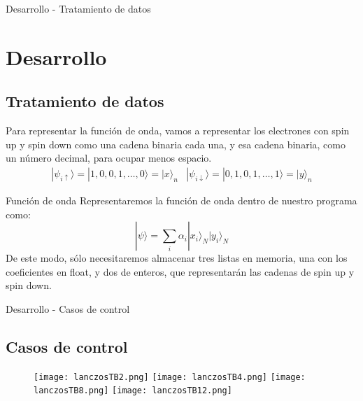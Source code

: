 \documentclass{beamer}
\begin{document}
\begin{frame}{Desarrollo - Tratamiento de datos}
    \section{Desarrollo}
    \subsection{Tratamiento de datos}
    Para representar la función de onda, vamos a representar los electrones con spin up y spin down como una cadena binaria cada una, y esa cadena binaria, como un número decimal, para ocupar menos espacio.
    $$
    \begin{array}{cc}
        |\psi_{i\uparrow}\rangle = |1, 0, 0, 1, \ldots, 0\rangle = |x\rangle_n & |\psi_{i\downarrow}\rangle = |0, 1, 0, 1, \ldots, 1\rangle = |y\rangle_n
    \end{array}
    $$
    \begin{block}{Función de onda}
        Representaremos la función de onda dentro de nuestro programa como:
        $$
        |\psi\rangle = \sum_i\alpha_i|x_i\rangle_N|y_i\rangle_N
        $$
        De este modo, sólo necesitaremos almacenar tres listas en memoria, una con los coeficientes en float, y dos de enteros, que representarán las cadenas de spin up y spin down.
    \end{block}
\end{frame}
\begin{frame}{Desarrollo - Casos de control}
    \subsection{Casos de control}
    \begin{figure}[h!]
        \begin{center}
            \texttt{[image: lanczosTB2.png]}
            \texttt{[image: lanczosTB4.png]}
            \texttt{[image: lanczosTB8.png]}
            \texttt{[image: lanczosTB12.png]}
        \end{center}
        \label{fig:greenTB}
    \end{figure}
\end{frame}
\end{document}
